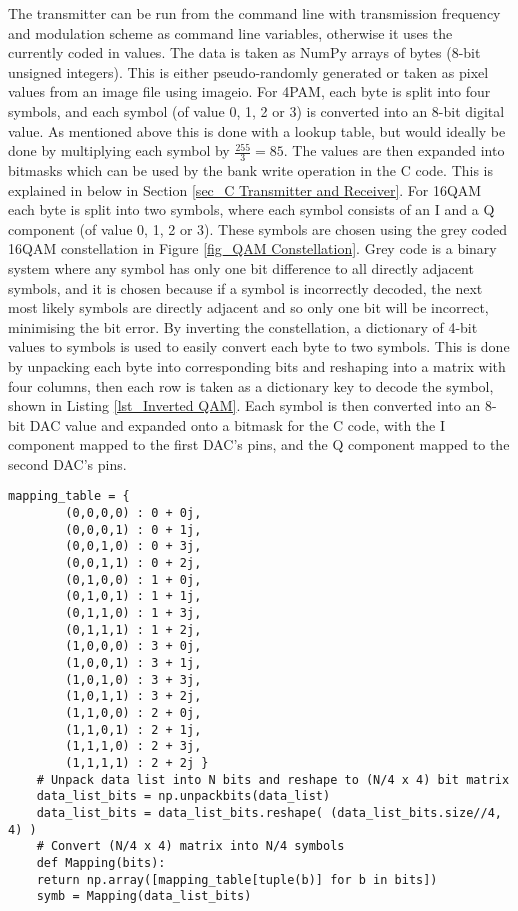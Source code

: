 \documentclass[../main.tex]{subfiles}
\begin{document}
The transmitter can be run from the command line with transmission frequency and modulation scheme as command line variables, otherwise it uses the currently coded in values.
The data is taken as NumPy arrays of bytes (8-bit unsigned integers).
This is either pseudo-randomly generated or taken as pixel values from an image file using imageio.
For 4PAM, each byte is split into four symbols, and each symbol (of value 0, 1, 2 or 3) is converted into an 8-bit digital value.
As mentioned above this is done with a lookup table, but would ideally be done by multiplying each symbol by $\frac{255}{3} = 85$.
The values are then expanded into bitmasks which can be used by the bank write operation in the C code.
This is explained in below in Section \ref{sec_C Transmitter and Receiver}.
For 16QAM each byte is split into two symbols, where each symbol consists of an I and a Q component (of value 0, 1, 2 or 3).
These symbols are chosen using the grey coded 16QAM constellation in Figure \ref{fig_QAM Constellation}.
Grey code is a binary system where any symbol has only one bit difference to all directly adjacent symbols, and it is chosen because if a symbol is incorrectly decoded, the next most likely symbols are directly adjacent and so only one bit will be incorrect, minimising the bit error.
By inverting the constellation, a dictionary of 4-bit values to symbols is used to easily convert each byte to two symbols.
This is done by unpacking each byte into corresponding bits and reshaping into a matrix with four columns, then each row is taken as a dictionary key to decode the symbol, shown in Listing \ref{lst_Inverted QAM}.
Each symbol is then converted into an 8-bit DAC value and expanded onto a bitmask for the C code, with the I component mapped to the first DAC's pins, and the Q component mapped to the second DAC's pins.\\

	\begin{lstlisting}[caption={Inverted QAM Constellation and its use to encode each byte as two symbols}, label={lst_Inverted QAM}]
	mapping_table = {
		(0,0,0,0) : 0 + 0j,
		(0,0,0,1) : 0 + 1j,
		(0,0,1,0) : 0 + 3j,
		(0,0,1,1) : 0 + 2j,
		(0,1,0,0) : 1 + 0j,
		(0,1,0,1) : 1 + 1j,
		(0,1,1,0) : 1 + 3j,
		(0,1,1,1) : 1 + 2j,
		(1,0,0,0) : 3 + 0j,
		(1,0,0,1) : 3 + 1j,
		(1,0,1,0) : 3 + 3j,
		(1,0,1,1) : 3 + 2j,
		(1,1,0,0) : 2 + 0j,
		(1,1,0,1) : 2 + 1j,
		(1,1,1,0) : 2 + 3j,
		(1,1,1,1) : 2 + 2j }
	# Unpack data list into N bits and reshape to (N/4 x 4) bit matrix
	data_list_bits = np.unpackbits(data_list)
	data_list_bits = data_list_bits.reshape( (data_list_bits.size//4, 4) )
	# Convert (N/4 x 4) matrix into N/4 symbols
	def Mapping(bits):
	return np.array([mapping_table[tuple(b)] for b in bits])
	symb = Mapping(data_list_bits)
\end{lstlisting}
\end{document}
